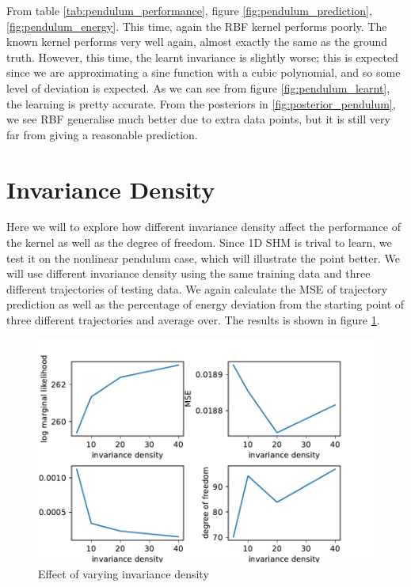 \documentclass{statsmsc}
\begin{document}
From table \ref{tab:pendulum_performance}, figure \ref{fig:pendulum_prediction}, \ref{fig:pendulum_energy}.
This time, again the RBF kernel performs poorly.
The known kernel performs very well again, almost exactly the same as the ground truth.
However, this time, the learnt invariance is slightly worse; this is expected since we are approximating a sine function with a cubic polynomial, and so some level of deviation is expected.
As we can see from figure \ref{fig:pendulum_learnt}, the learning is pretty accurate.
From the posteriors in \ref{fig:posterior_pendulum}, we see RBF generalise much better due to extra data points, but it is still very far from giving a reasonable prediction. 


\section{Invariance Density}
Here we will to explore how different invariance density affect the performance of the kernel as well as the degree of freedom.
Since 1D SHM is trival to learn, we test it on the nonlinear pendulum case, which will illustrate the point better. 
We will use different invariance density using the same training data and three different trajectories of testing data.
We again calculate the MSE of trajectory prediction as well as the percentage of energy deviation from the starting point of three different trajectories and average over.
The results is shown in figure \ref{fig:vary_invariance_density}.

\begin{figure}[H] 
  \includegraphics[width=0.8\linewidth]{../codes/figures/vary_invariance.pdf}
  \centering
  \caption{Effect of varying invariance density}
  \label{fig:vary_invariance_density}
\end{figure}
\end{document}
